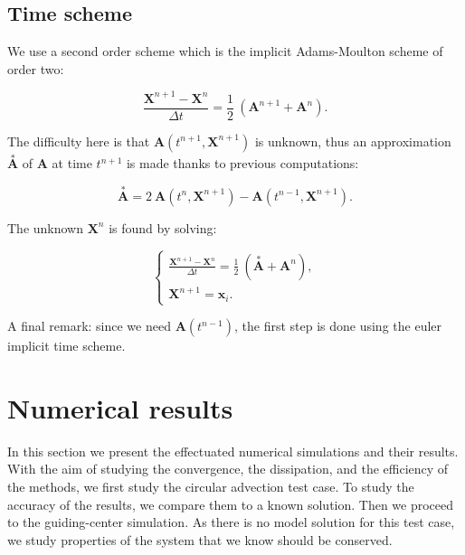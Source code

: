 \documentclass[proc]{edpsmath}
\begin{document}
\subsection{Time scheme}
We use a second order scheme which is the implicit Adams-Moulton scheme of order two: 

 \begin{equation*}
 	 \displaystyle{ \frac{\textbf{X}^{n+1}-\textbf{X}^{n}}{ \Delta t } =\frac{1}{2} ~( \textbf{A}^{n+1}+\textbf{A}^{n} ) }.
 \end{equation*} 
 
\noindent The difficulty here is that  $\textbf{A}(t^{n+1},\textbf{X}^{n+1})$ is unknown, thus an approximation $\overset{*}{\textbf{A}}$ of    $\textbf{A}$ at time $t^{n+1}$ is made thanks to previous computations:
 
 \begin{equation*}
\overset{*}{\textbf{A}}= 2~\textbf{A}(t^{n},\textbf{X}^{n+1}) -  \textbf{A}(t^{n-1},\textbf{X}^{n+1}).
 \end{equation*} 
 
\noindent The unknown $\textbf{X}^{n}$ is found by solving:
 
 
 \begin{equation*}
 	\begin{cases}
 	 \displaystyle{ \frac{\textbf{X}^{n+1}-\textbf{X}^{n}}{ \Delta t } =\frac{1}{2} ~(\overset{*}{\textbf{A}}+\textbf{A}^{n} ) },\\[3.5mm]
 	 \textbf{X}^{n+1}=\textbf{x}_i .
 	\end{cases}
 \end{equation*} 
 
A final remark: since we need $\textbf{A}(t^{n-1})$, the first step is done using the euler implicit time scheme. 
 
\section{Numerical results}
\label{sec:results}
In this section we present the effectuated numerical simulations and their results. With the aim of studying the convergence, the dissipation, and the  efficiency of the methods, we first study the circular advection test case. To study the accuracy of the results, we compare them to a known solution. Then we proceed to the guiding-center simulation. As there is no model solution for this test case, we study properties of the system that we know should be conserved.
\end{document}
